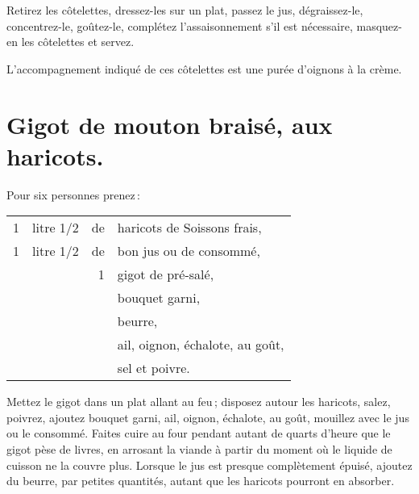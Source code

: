 Retirez les côtelettes, dressez-les sur un plat, passez le jus, dégraissez-le,
concentrez-le, goûtez-le, complétez l'assaisonnement s'il est nécessaire,
masquez-en les côtelettes et servez.

L'accompagnement indiqué de ces côtelettes est une purée d'oignons à la crème.

\section*{\centering Gigot de mouton braisé, aux haricots.}
{}

Pour six personnes prenez :

\medskip

\footnotesize
\begin{longtable}{rrrp{16em}}
        1 & litre 1/2 & de & haricots de Soissons frais,                                                  \\
        1 & litre 1/2 & de & bon jus ou de consommé,                                                      \\
          &           &  1 & gigot de pré-salé,                                                           \\
          &           &    & bouquet garni,                                                               \\
          &           &    & beurre,                                                                      \\
          &           &    & ail, oignon, échalote, au goût,                                              \\
          &           &    & sel et poivre.                                                               \\
\end{longtable}
\normalsize

Mettez le gigot dans un plat allant au feu ; disposez autour les haricots, salez,
poivrez, ajoutez bouquet garni, ail, oignon, échalote, au goût, mouillez avec le jus
ou le consommé. Faites cuire au four pendant autant de quarts d'heure que le
gigot pèse de livres, en arrosant la viande à partir du moment où le liquide de
cuisson ne la couvre plus. Lorsque le jus est presque complètement épuisé, ajoutez
du beurre, par petites quantités, autant que les haricots pourront en absorber.

